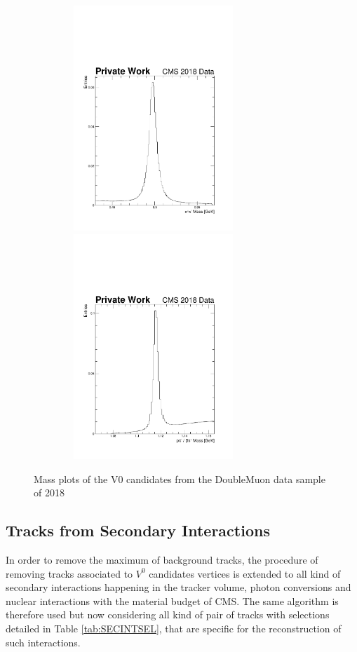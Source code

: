 \documentclass{cernatlasnote}
\begin{document}
\begin{figure}[ht]
\hspace{-1.4cm}
\includegraphics[height=8.5cm, width=9cm, trim= 0cm 0cm 0cm 0.cm,clip]{images/V0Candidates/DoubleMuon_UL2018_MiniAODv2_GT36-v1_hData_reco_K0_mass_.pdf}\includegraphics[height=8.5cm, width=9cm, trim= 0cm 0cm 0cm 0.cm,clip]{images/V0Candidates/DoubleMuon_UL2018_MiniAODv2_GT36-v1_hData_reco_L0_mass_.pdf}
\caption{\label{fig:V0Candidates} Mass plots of the V0 candidates from the DoubleMuon data sample of 2018}
\end{figure}

\subsection{Tracks from Secondary Interactions}

In order to remove the maximum of background tracks, the procedure of removing tracks associated to $V^0$ candidates vertices is extended to all kind of secondary interactions happening in the tracker volume, photon conversions and nuclear interactions with the material budget of CMS. The same algorithm is therefore used but now considering all kind of pair of tracks with selections detailed in Table \ref{tab:SECINTSEL}, that are specific for the reconstruction of such interactions.\\
\end{document}
